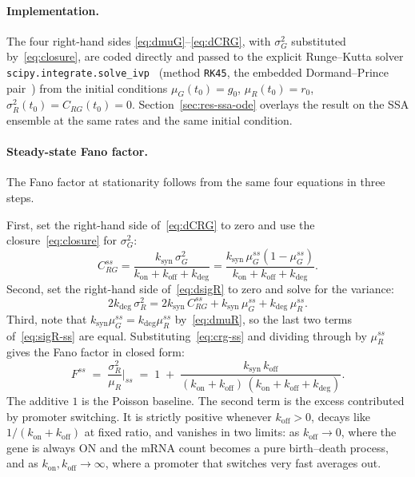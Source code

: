 \documentclass[11pt]{article}
\newcommand{\muG}{\mu_G}
\newcommand{\muR}{\mu_R}
\newcommand{\sigGsq}{\sigma_G^2}
\newcommand{\sigRsq}{\sigma_R^2}
\newcommand{\CRG}{C_{RG}}
\newcommand{\kon}{k_{\mathrm{on}}}
\newcommand{\koff}{k_{\mathrm{off}}}
\newcommand{\ksyn}{k_{\mathrm{syn}}}
\newcommand{\kdeg}{k_{\mathrm{deg}}}
\begin{document}
\paragraph{Implementation.}
The four right-hand sides
\eqref{eq:dmuG}--\eqref{eq:dCRG}, with $\sigGsq$ substituted by~\eqref{eq:closure}, are coded
directly and passed to the explicit Runge--Kutta solver \texttt{scipy.integrate.solve\_ivp}~\cite{virtanen2020}
(method \texttt{RK45}, the embedded Dormand--Prince pair~\cite{dormand1980}) from the initial conditions $\muG(t_0)=g_0$, $\muR(t_0)=r_0$,
$\sigRsq(t_0)=\CRG(t_0)=0$. Section~\ref{sec:res-ssa-ode} overlays the result on the SSA
ensemble at the same rates and the same initial condition.

\paragraph{Steady-state Fano factor.}
The Fano factor at stationarity follows from the same four equations in three steps.

First, set the right-hand side of~\eqref{eq:dCRG} to zero and use the closure~\eqref{eq:closure}
for $\sigGsq$:
\begin{equation}
\label{eq:crg-ss}
  \CRG^{ss} = \frac{\ksyn\,\sigGsq}{\kon+\koff+\kdeg}
            = \frac{\ksyn\,\muG^{ss}(1-\muG^{ss})}{\kon+\koff+\kdeg} .
\end{equation}
Second, set the right-hand side of~\eqref{eq:dsigR} to zero and solve for the variance:
\begin{equation}
\label{eq:sigR-ss}
  2\kdeg\,\sigRsq = 2\ksyn\,\CRG^{ss} + \ksyn\,\muG^{ss} + \kdeg\,\muR^{ss} .
\end{equation}
Third, note that $\ksyn\muG^{ss}=\kdeg\muR^{ss}$ by~\eqref{eq:dmuR}, so the last two terms
of~\eqref{eq:sigR-ss} are equal. Substituting~\eqref{eq:crg-ss} and dividing through by
$\muR^{ss}$ gives the Fano factor in closed form:
\begin{equation}
\label{eq:fano}
  F^{ss} \;=\; \frac{\sigRsq}{\muR}\bigg|_{ss}
  \;=\; 1 \;+\; \frac{\ksyn\,\koff}{(\kon+\koff)\,(\kon+\koff+\kdeg)} .
\end{equation}
The additive $1$ is the Poisson baseline. The second term is the excess contributed by promoter
switching. It is strictly positive whenever $\koff>0$, decays like $1/(\kon+\koff)$ at fixed ratio,
and vanishes in two limits: as $\koff\to0$, where the gene is always ON and the mRNA count becomes a
pure birth--death process, and as $\kon,\koff\to\infty$, where a promoter that switches very fast
averages out.
\end{document}
